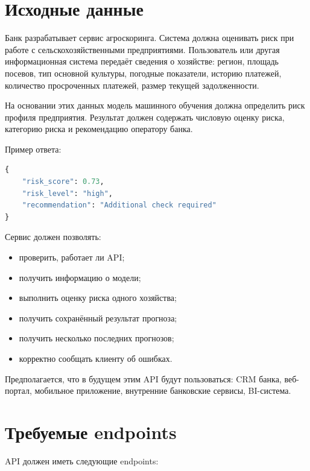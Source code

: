 \documentclass[12pt,a4paper]{article}
\begin{document}
\section{Исходные данные}

Банк разрабатывает сервис агроскоринга. Система должна оценивать риск при работе с сельскохозяйственными предприятиями. Пользователь или другая информационная система передаёт сведения о хозяйстве: регион, площадь посевов, тип основной культуры, погодные показатели, историю платежей, количество просроченных платежей, размер текущей задолженности.

На основании этих данных модель машинного обучения должна определить риск профиля предприятия. Результат должен содержать числовую оценку риска, категорию риска и рекомендацию оператору банка.

Пример ответа:

\begin{lstlisting}[language=Python, caption={Пример ответа /predict}]
{
    "risk_score": 0.73,
    "risk_level": "high",
    "recommendation": "Additional check required"
}
\end{lstlisting}

Сервис должен позволять:

\begin{itemize}
    \item проверить, работает ли API;
    \item получить информацию о модели;
    \item выполнить оценку риска одного хозяйства;
    \item получить сохранённый результат прогноза;
    \item получить несколько последних прогнозов;
    \item корректно сообщать клиенту об ошибках.
\end{itemize}

Предполагается, что в будущем этим API будут пользоваться: CRM банка, веб-портал, мобильное приложение, внутренние банковские сервисы, BI-система.

\section{Требуемые endpoints}

API должен иметь следующие endpoints:
\end{document}

